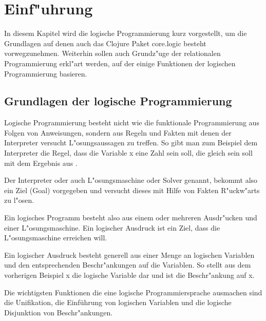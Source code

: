 \section{Einf"uhrung}

In diesem Kapitel wird die logische Programmierung kurz vorgestellt, um die Grundlagen auf denen auch das Clojure Paket core.logic besteht vorwegzunehmen. Weiterhin sollen auch Grundz"uge der relationalen Programmierung erkl"art werden, auf der einige Funktionen der logischen Programmierung basieren.

\subsection{Grundlagen der logische Programmierung}

Logische Programmierung besteht nicht wie die funktionale Programmierung aus Folgen von Anweisungen, sondern aus Regeln und Fakten mit denen der Interpreter versucht L"osungsaussagen zu treffen. So gibt man zum Beispiel dem Interpreter die Regel, dass die Variable x eine Zahl sein soll, die gleich sein soll mit dem Ergebnis aus .

Der Interpreter oder auch L"osungsmaschine oder Solver genannt, bekommt also ein Ziel (Goal) vorgegeben und versucht dieses mit Hilfe von Fakten R"uckw"arts zu l"osen.


Ein logisches Programm besteht also aus einem oder mehreren Ausdr"ucken und einer L"osungsmaschine. Ein logischer Ausdruck ist ein Ziel, dass die L"osungsmaschine erreichen will.

Ein logischer Ausdruck besteht generell aus einer Menge an logischen Variablen und den entsprechenden Beschr"ankungen auf die Variablen. So stellt aus dem vorherigen Beispiel x die logische Variable dar und  ist die Beschr"ankung auf x.


Die wichtigsten Funktionen die eine logische Programmiersprache ausmachen sind die Unifikation, die Einführung von logischen Variablen und die logische Disjunktion von Beschr"ankungen.
